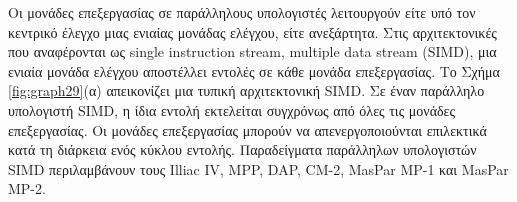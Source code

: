 \documentclass[12pt,a4paper]{article}
\begin{document}
Οι μονάδες επεξεργασίας σε παράλληλους υπολογιστές λειτουργούν είτε υπό τον
κεντρικό έλεγχο μιας ενιαίας μονάδας ελέγχου, είτε ανεξάρτητα. Στις αρχιτεκτονικές
που αναφέρονται ως \foreignlanguage{english}{single instruction stream, multiple data stream (SIMD)}, 
μια ενιαία μονάδα ελέγχου αποστέλλει εντολές σε κάθε μονάδα επεξεργασίας. 
Το Σχήμα \ref{fig:graph29}(α) απεικονίζει μια τυπική αρχιτεκτονική \foreignlanguage{english}{SIMD}.
Σε έναν παράλληλο υπολογιστή \foreignlanguage{english}{SIMD}, η ίδια εντολή εκτελείται συγχρόνως από όλες τις
μονάδες επεξεργασίας. Οι μονάδες επεξεργασίας μπορούν να απενεργοποιούνται επιλεκτικά
κατά τη διάρκεια ενός κύκλου εντολής. Παραδείγματα παράλληλων υπολογιστών \foreignlanguage{english}{SIMD}
περιλαμβάνουν τους \foreignlanguage{english}{Illiac IV, MPP, DAP, CM-2, MasPar MP-1} και \foreignlanguage{english}{MasPar MP-2}.
\end{document}
